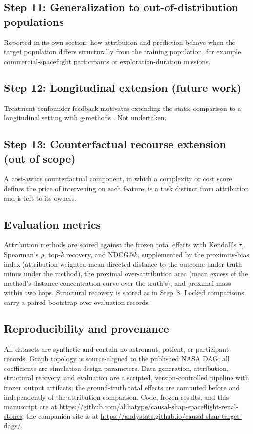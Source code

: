 \documentclass[11pt]{article}
\begin{document}
\subsection*{Step 11: Generalization to out-of-distribution populations}
Reported in its own section: how attribution and prediction behave when the
target population differs structurally from the training population, for
example commercial-spaceflight participants or exploration-duration
missions.

\subsection*{Step 12: Longitudinal extension (future work)}
Treatment-confounder feedback motivates extending the static comparison to
a longitudinal setting with g-methods \citep{Robins2000}. Not undertaken.

\subsection*{Step 13: Counterfactual recourse extension (out of scope)}
A cost-aware counterfactual component, in which a complexity or cost score
defines the price of intervening on each feature, is a task distinct from
attribution and is left to its owners.

\subsection*{Evaluation metrics}
Attribution methods are scored against the frozen total effects with
Kendall's $\tau$, Spearman's $\rho$, top-$k$ recovery, and NDCG@$k$,
supplemented by the proximity-bias index (attribution-weighted mean directed
distance to the outcome under truth minus under the method), the proximal
over-attribution area (mean excess of the method's distance-concentration
curve over the truth's), and proximal mass within two hops. Structural
recovery is scored as in Step~8. Locked comparisons carry a paired bootstrap
over evaluation records.

\subsection*{Reproducibility and provenance}
All datasets are synthetic and contain no astronaut, patient, or participant
records. Graph topology is source-aligned to the published NASA DAG; all
coefficients are simulation design parameters. Data generation, attribution,
structural recovery, and evaluation are a scripted, version-controlled
pipeline with frozen output artifacts; the ground-truth total effects are
computed before and independently of the attribution comparison. Code,
frozen results, and this manuscript are at
\url{https://github.com/ahhatype/causal-shap-spaceflight-renal-stones};
the companion site is at
\url{https://andystats.github.io/causal-shap-target-dags/}.



\end{document}
